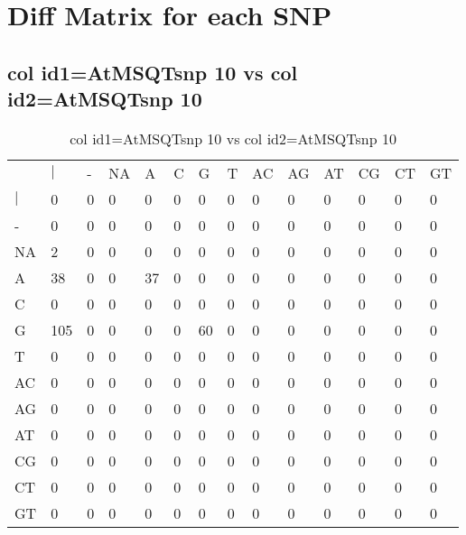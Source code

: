 \section{Diff Matrix for each SNP} \label{section_snp_wise}
\subsection{col id1=AtMSQTsnp 10 vs col id2=AtMSQTsnp 10}
\begin{center}
\begin{longtable}{|l|l|l|l|l|l|l|l|l|l|l|l|l|l|}
\caption{col id1=AtMSQTsnp 10 vs col id2=AtMSQTsnp 10} \label{table_dm486}\\
\hline
\\
\hline
&$|$&-&NA&A&C&G&T&AC&AG&AT&CG&CT&GT\\
$|$&0&0&0&0&0&0&0&0&0&0&0&0&0\\
-&0&0&0&0&0&0&0&0&0&0&0&0&0\\
NA&2&0&0&0&0&0&0&0&0&0&0&0&0\\
A&38&0&0&37&0&0&0&0&0&0&0&0&0\\
C&0&0&0&0&0&0&0&0&0&0&0&0&0\\
G&105&0&0&0&0&60&0&0&0&0&0&0&0\\
T&0&0&0&0&0&0&0&0&0&0&0&0&0\\
AC&0&0&0&0&0&0&0&0&0&0&0&0&0\\
AG&0&0&0&0&0&0&0&0&0&0&0&0&0\\
AT&0&0&0&0&0&0&0&0&0&0&0&0&0\\
CG&0&0&0&0&0&0&0&0&0&0&0&0&0\\
CT&0&0&0&0&0&0&0&0&0&0&0&0&0\\
GT&0&0&0&0&0&0&0&0&0&0&0&0&0\\
\hline
\end{longtable}
\end{center}

